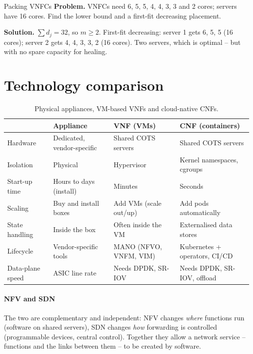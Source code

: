 \documentclass[11pt,a4paper]{article}
\begin{document}
\begin{examplebox}{Packing VNFCs}\label{ex:pack}
\textbf{Problem.} VNFCs need 6, 5, 5, 4, 4, 3, 3 and 2 cores; servers have 16 cores. Find the lower bound and a first-fit
decreasing placement.

\textbf{Solution.} $\sum d_j = 32$, so $m \ge 2$. First-fit decreasing: server 1 gets 6, 5, 5 (16 cores); server 2 gets
4, 4, 3, 3, 2 (16 cores). Two servers, which is optimal -- but with no spare capacity for healing.
\end{examplebox}

\section{Technology comparison}
\begin{table}[htbp]
\centering\small
\caption{Physical appliances, VM-based VNFs and cloud-native CNFs.}\label{tab:cmp}
\begin{tabularx}{\linewidth}{@{}l Y Y Y@{}}
\toprule
{} & Appliance & VNF (VMs) & CNF (containers) \\
\midrule
Hardware          & Dedicated, vendor-specific & Shared COTS servers & Shared COTS servers \\
Isolation         & Physical                   & Hypervisor          & Kernel namespaces, cgroups \\
Start-up time     & Hours to days (install)    & Minutes             & Seconds \\
Scaling           & Buy and install boxes      & Add VMs (scale out/up) & Add pods automatically \\
State handling    & Inside the box             & Often inside the VM & Externalised data stores \\
Lifecycle         & Vendor-specific tools      & MANO (NFVO, VNFM, VIM) & Kubernetes + operators, CI/CD \\
Data-plane speed  & ASIC line rate             & Needs DPDK, SR-IOV  & Needs DPDK, SR-IOV, offload \\
\bottomrule
\end{tabularx}
\end{table}

\paragraph{NFV and SDN} The two are complementary and independent: NFV changes \emph{where} functions run (software on
shared servers), SDN changes \emph{how} forwarding is controlled (programmable devices, central control). Together
they allow a network service -- functions and the links between them -- to be created by software.
\end{document}
